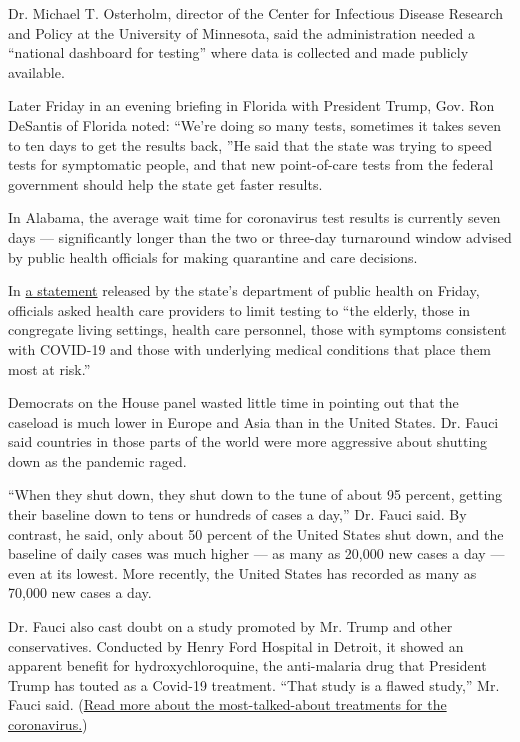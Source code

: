 Dr. Michael T. Osterholm, director of the Center for Infectious Disease
Research and Policy at the University of Minnesota, said the
administration needed a ``national dashboard for testing'' where data is
collected and made publicly available.

Later Friday in an evening briefing in Florida with President Trump,
Gov. Ron DeSantis of Florida noted: ``We're doing so many tests,
sometimes it takes seven to ten days to get the results back, ''He said
that the state was trying to speed tests for symptomatic people, and
that new point-of-care tests from the federal government should help the
state get faster results.

In Alabama, the average wait time for coronavirus test results is
currently seven days --- significantly longer than the two or three-day
turnaround window advised by public health officials for making
quarantine and care decisions.

In \href{https://www.alabamapublichealth.gov/news/2020/07/31e.html}{a
statement} released by the state's department of public health on
Friday, officials asked health care providers to limit testing to ``the
elderly, those in congregate living settings, health care personnel,
those with symptoms consistent with COVID-19 and those with underlying
medical conditions that place them most at risk.''

Democrats on the House panel wasted little time in pointing out that the
caseload is much lower in Europe and Asia than in the United States. Dr.
Fauci said countries in those parts of the world were more aggressive
about shutting down as the pandemic raged.

``When they shut down, they shut down to the tune of about 95 percent,
getting their baseline down to tens or hundreds of cases a day,'' Dr.
Fauci said. By contrast, he said, only about 50 percent of the United
States shut down, and the baseline of daily cases was much higher --- as
many as 20,000 new cases a day --- even at its lowest. More recently,
the United States has recorded as many as 70,000 new cases a day.

Dr. Fauci also cast doubt on a study promoted by Mr. Trump and other
conservatives. Conducted by Henry Ford Hospital in Detroit, it showed an
apparent benefit for hydroxychloroquine, the anti-malaria drug that
President Trump has touted as a Covid-19 treatment. ``That study is a
flawed study,'' Mr. Fauci said.
(\href{https://www.nytimes.com/interactive/2020/science/coronavirus-drugs-treatments.html}{Read
more about the most-talked-about treatments for the coronavirus.})


